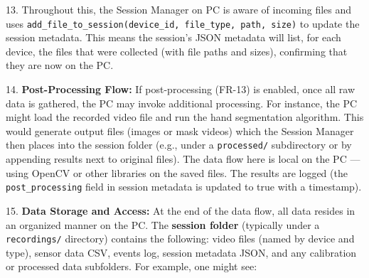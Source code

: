 \documentclass[11pt,a4paper]{report}
\begin{document}
13. Throughout this, the Session Manager on PC is aware of incoming
    files and uses
    \texttt{add\_file\_to\_session(device\_id, file\_type, path, size)} to update
    the session
    metadata.
    This means the session's JSON metadata will list, for each device,
    the files that were collected (with file paths and sizes),
    confirming that they are now on the PC.

14. \textbf{Post-Processing Flow:} If post-processing (FR-13) is enabled,
    once all raw data is gathered, the PC may invoke additional
    processing. For instance, the PC might load the recorded video file
    and run the hand segmentation algorithm. This would generate output
    files (images or mask videos) which the Session Manager then places
    into the session folder (e.g., under a \texttt{processed/} subdirectory or
    by appending results next to original files). The data flow here is
    local on the PC --- using OpenCV or other libraries on the saved
    files. The results are logged (the \texttt{post\_processing} field in
    session metadata is updated to true with a
    timestamp).

15. \textbf{Data Storage and Access:} At the end of the data flow, all data
    resides in an organized manner on the PC. The \textbf{session folder}
    (typically under a \texttt{recordings/} directory) contains the following:
    video files (named by device and type), sensor data CSV, events log,
    session metadata JSON, and any calibration or processed data
    subfolders. For example, one might see:
\end{document}
